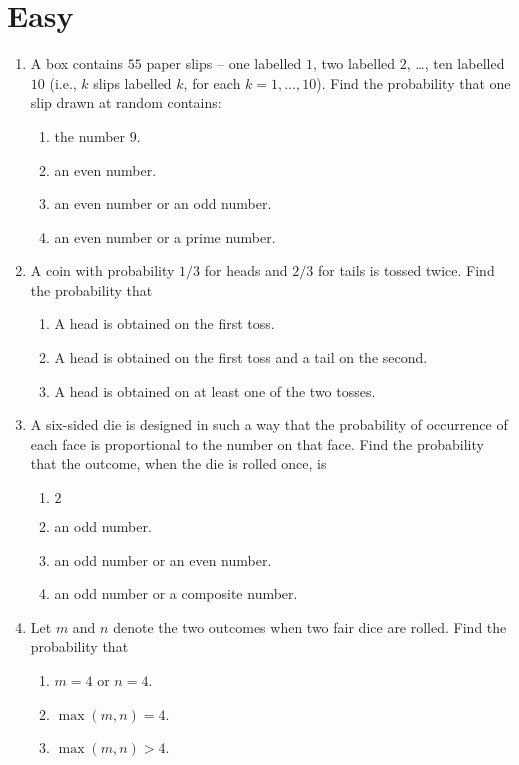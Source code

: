 \documentclass[svgnames]{amsart}
\begin{document}
\section{Easy}
\begin{enumerate}[leftmargin=*]
\item A box contains $55$ paper slips -- one labelled $1$, two labelled $2$, \ldots, ten labelled $10$ (i.e., $k$ slips labelled $k$, for each $k = 1, \ldots, 10$). Find the probability that one slip drawn at random contains:
\begin{enumerate}
	\item the number $9$.
	\item an even number.
	\item an even number or an odd number.
	\item an even number or a prime number.
\end{enumerate}

\item A coin with probability $1/3$ for heads and $2/3$ for tails is tossed twice. Find the probability that
\begin{enumerate}
	\item A head is obtained on the first toss.
	\item A head is obtained on the first toss and a tail on the second.
	\item A head is obtained on at least one of the two tosses.
\end{enumerate}

\item A six-sided die is designed in such a way that the probability of occurrence of each face is proportional to the number on that face. Find the probability that the outcome, when the die is rolled once, is
\begin{enumerate}
	\item $2$
	\item an odd number.
	\item an odd number or an even number.
	\item an odd number or a composite number.
\end{enumerate}

\item Let $m$ and $n$ denote the two outcomes when two fair dice are rolled. Find the probability that
\begin{enumerate}
	\item $m = 4$ or $n = 4$.
	\item $\max(m, n) = 4$.
	\item $\max(m, n) > 4$.
\end{enumerate}


\end{enumerate}
\end{document}
